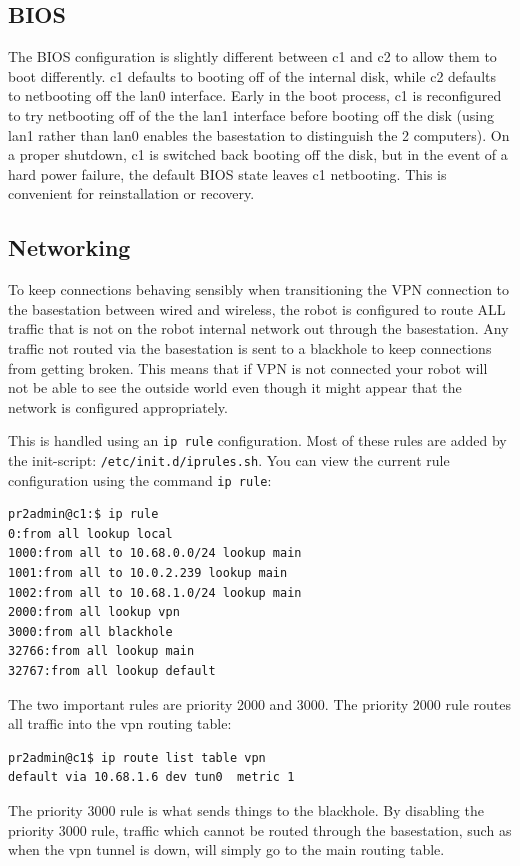 \subsection{BIOS}
The BIOS configuration is slightly different between c1 and c2 to
allow them to boot differently.  c1 defaults to booting off of the
internal disk, while c2 defaults to netbooting off the lan0 interface.
Early in the boot process, c1 is reconfigured to try netbooting off of
the the lan1 interface before booting off the disk (using lan1 rather
than lan0 enables the basestation to distinguish the 2 computers).  On
a proper shutdown, c1 is switched back booting off the disk, but in
the event of a hard power failure, the default BIOS state leaves c1
netbooting.  This is convenient for reinstallation or recovery.

\subsection{Networking}
To keep connections behaving sensibly when transitioning the VPN
connection to the basestation between wired and wireless, the robot is
configured to route ALL traffic that is not on the robot internal
network out through the basestation.  Any traffic not routed via the
basestation is sent to a blackhole to keep connections from getting
broken.  This means that if VPN is not connected your robot will not
be able to see the outside world even though it might appear that the
network is configured appropriately.

This is handled using an \texttt{ip rule} configuration.  Most of
these rules are added by the init-script:
\texttt{/etc/init.d/iprules.sh}.  You can view the current rule
configuration using the command \texttt{ip rule}:
\begin{verbatim}
pr2admin@c1:$ ip rule
0:from all lookup local 
1000:from all to 10.68.0.0/24 lookup main 
1001:from all to 10.0.2.239 lookup main 
1002:from all to 10.68.1.0/24 lookup main 
2000:from all lookup vpn 
3000:from all blackhole
32766:from all lookup main 
32767:from all lookup default
\end{verbatim}
The two important rules are priority 2000 and 3000.  The priority 2000
rule routes all traffic into the vpn routing table:
\begin{verbatim}
pr2admin@c1$ ip route list table vpn
default via 10.68.1.6 dev tun0  metric 1 
\end{verbatim}
The priority 3000 rule is what sends things to the blackhole.  By
disabling the priority 3000 rule, traffic which cannot be routed
through the basestation, such as when the vpn tunnel is down, will
simply go to the main routing table.

